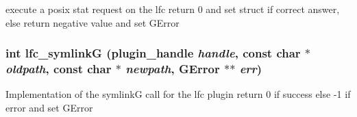 execute a posix stat request on the lfc return 0 and set struct if correct answer, else return negative value and set GError 
\subsubsection{\setlength{\rightskip}{0pt plus 5cm}int lfc\_\-symlink\-G (plugin\_\-handle {\em handle}, const char $\ast$ {\em oldpath}, const char $\ast$ {\em newpath}, GError $\ast$$\ast$ {\em err})}\label{gfal__common__lfc_8c_5d1f7f46eb2843996cf95fd020086675}


Implementation of the symlink\-G call for the lfc plugin return 0 if success else -1 if error and set GError 